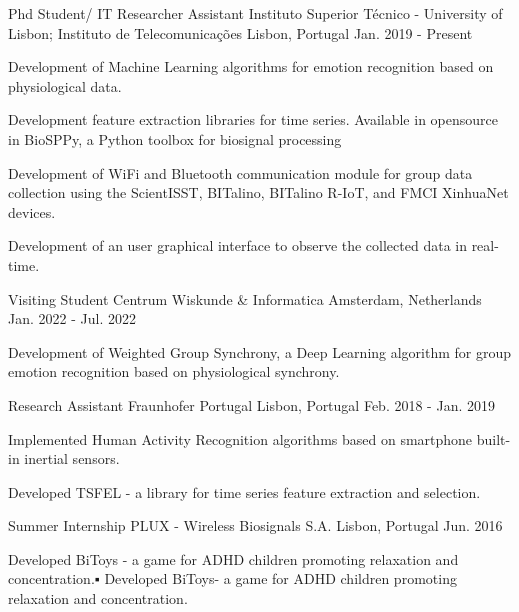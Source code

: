 \begin{cventries}
  \cventry
    {Phd Student/ IT Researcher Assistant} %
    {Instituto Superior Técnico - University of Lisbon; Instituto de Telecomunicações} %
    {Lisbon, Portugal} %
    {Jan. 2019 - Present} %
    {
      \begin{cvitems} %
        \item {Development of Machine Learning algorithms for emotion recognition based on physiological data.}
        \item {Development feature extraction libraries for time series. Available in opensource in BioSPPy, a Python toolbox for biosignal processing}
        \item {Development of WiFi and Bluetooth communication module for group data collection using the ScientISST, BITalino, BITalino R-IoT, and FMCI XinhuaNet devices.}
        \item {Development of an user graphical interface to observe the collected data in real-time.}
      \end{cvitems}
    }
\cventry
{Visiting Student} %
{Centrum Wiskunde \& Informatica} %
{Amsterdam, Netherlands} %
{Jan. 2022 - Jul. 2022} %
{
  \begin{cvitems} %
    \item {Development of Weighted Group Synchrony, a Deep Learning algorithm for group emotion recognition based on physiological synchrony.}
  \end{cvitems}
}
\cventry
{Research Assistant} %
{Fraunhofer Portugal} %
{Lisbon, Portugal} %
{Feb. 2018 - Jan. 2019} %
{
  \begin{cvitems} %
    \item {Implemented Human Activity Recognition algorithms based on smartphone built-in inertial sensors.}
    \item {Developed TSFEL - a library for time series feature extraction and selection.}
  \end{cvitems}
}
\cventry
{Summer Internship} %
{PLUX - Wireless Biosignals S.A.} %
{Lisbon, Portugal} %
{Jun. 2016} %
{
  \begin{cvitems} %
    \item {Developed BiToys - a game for ADHD children promoting relaxation and concentration.▪︎ Developed BiToys- a game for ADHD children promoting relaxation and concentration.
    }
  \end{cvitems}
}
\end{cventries}
